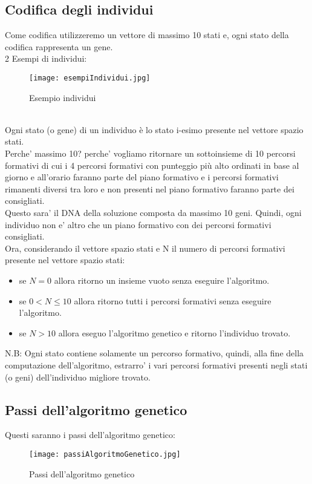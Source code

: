 \documentclass[10pt,a4paper]{article}
\begin{document}
    \subsection{Codifica degli individui}
      \label{codificaDegliIndividuiSubsection}
      Come codifica utilizzeremo un vettore di massimo 10 stati e, ogni stato della codifica rappresenta un gene.\\
      2 Esempi di individui:
      \begin{figure}[h!]
        \centering
        \caption{Esempio individui}
        \texttt{[image: esempiIndividui.jpg]}
        \label{esempioIndividui}
      \end{figure}\\
      Ogni stato (o gene) di un individuo è lo stato i-esimo presente nel vettore spazio stati.\\
      Perche' massimo 10? perche' vogliamo ritornare un sottoinsieme di 10 percorsi formativi di cui i 
      4 percorsi formativi con punteggio più alto ordinati in base al giorno e all'orario faranno parte 
      del piano formativo e i percorsi formativi rimanenti diversi tra loro e non presenti 
      nel piano formativo faranno parte dei consigliati.\\
      Questo sara' il DNA della soluzione composta da massimo 10 geni. Quindi, ogni individuo non e' 
      altro che un piano formativo con dei percorsi formativi consigliati.\\
      Ora, considerando il vettore spazio stati e N il numero di percorsi formativi presente 
      nel vettore spazio stati:\\
      \begin{itemize}
        \item se $ N = 0 $ allora ritorno un insieme vuoto senza eseguire l'algoritmo.
        \item se $ 0 < N \leq 10 $ allora ritorno tutti i percorsi formativi senza eseguire 
        l'algoritmo.
        \item se $ N > 10 $ allora eseguo l'algoritmo genetico e ritorno l'individuo trovato.
      \end{itemize}
      N.B: Ogni stato contiene solamente un percorso formativo, quindi, alla fine della computazione dell'algoritmo, 
      estrarro' i vari percorsi formativi presenti negli stati (o geni) dell'individuo migliore trovato.
      
      \newpage
      
    \subsection{Passi dell'algoritmo genetico}
      \label{passiDellAlgoritmoGeneticoSubsection}
      Questi saranno i passi dell'algoritmo genetico:
      \begin{figure}[h!]
        \centering
        \caption{Passi dell'algoritmo genetico}
        \texttt{[image: passiAlgoritmoGenetico.jpg]}
        \label{passiAlgoritmoGenetico}
      \end{figure}\\
            
\end{document}
